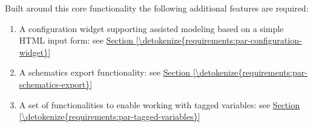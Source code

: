 \documentclass[letterpaper,10pt, openany,english]{sphinxmanual}
\begin{document}
Built around this core functionality the following additional features are required:
\begin{enumerate}
%
\item {} 
A configuration widget supporting assisted modeling based on a simple HTML input form: see \hyperref[\detokenize{requirements:par-configuration-widget}]{Section \ref{\detokenize{requirements:par-configuration-widget}}}

\item {} 
A schematics export functionality: see \hyperref[\detokenize{requirements:par-schematics-export}]{Section \ref{\detokenize{requirements:par-schematics-export}}}

\item {} 
A set of functionalities to enable working with tagged variables: see \hyperref[\detokenize{requirements:par-tagged-variables}]{Section \ref{\detokenize{requirements:par-tagged-variables}}}

\end{enumerate}
\end{document}
